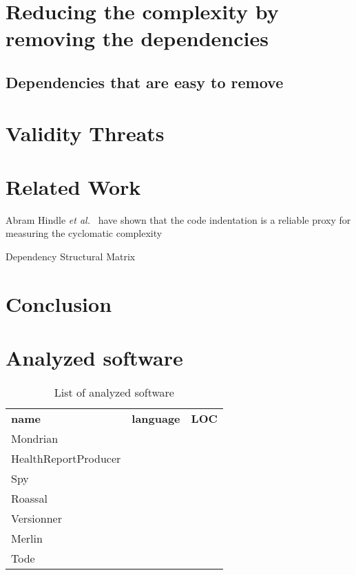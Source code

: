\documentclass{sig-alternate}
\newcommand{\etal}{\emph{et al.}\xspace}
\newcommand{\seclabel}[1]{\label{sec:#1}}
\begin{document}
\section{Reducing the complexity by removing the dependencies}

\subsection{Dependencies that are easy to remove}

\section{Validity Threats}



\section{Related Work}

Abram Hindle \etal~\cite{Hind08a} have shown that the code indentation is a reliable proxy for measuring the cyclomatic complexity

Dependency Structural Matrix~\cite{Sang05a}

\section{Conclusion}\seclabel{conclusion}







\appendix

\section{Analyzed software} \seclabel{listOfSoftware}

\begin{table}
\begin{tabular}{|l|l|l|}\hline
\textbf{name} & \textbf{language} & \textbf{LOC}\\
Mondrian\\
HealthReportProducer\\
Spy\\
Roassal\\
Versionner\\
Merlin\\
Tode\\
\end{tabular}
\caption{List of analyzed software}
\end{table}
\end{document}
